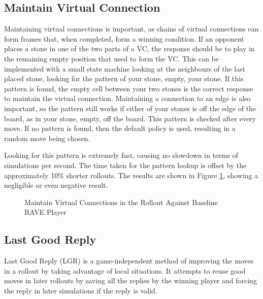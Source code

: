 \subsection{Maintain Virtual Connection}

Maintaining virtual connections is important, as chains of virtual connections can form frames that, when completed, form a winning condition. If an opponent places a stone in one of the two parts of a VC, the response should be to play in the remaining empty position that used to form the VC. This can be implemented with a small state machine looking at the neighbours of the last placed stone, looking for the pattern of your stone, empty, your stone. If this pattern is found, the empty cell between your two stones is the correct response to maintain the virtual connection. Maintaining a connection to an edge is also important, so the pattern still works if either of your stones is off the edge of the board, as in your stone, empty, off the board. This pattern is checked after every move. If no pattern is found, then the default policy is used, resulting in a random move being chosen.

Looking for this pattern is extremely fast, causing no slowdown in terms of simulations per second. The time taken for the pattern lookup is offset by the approximately 10\% shorter rollouts. The results are shown in Figure \ref{fig:maintainvcrollout}, showing a negligible or even negative result.

\begin{figure}
	\centering
{}
	\caption{Maintain Virtual Connections in the Rollout Against Baseline RAVE Player}
	\label{fig:maintainvcrollout}
\end{figure}

\subsection{Last Good Reply}

Last Good Reply (LGR) is a game-independent method of improving the moves in a rollout by taking advantage of local situations. It attempts to reuse good moves in later rollouts by saving all the replies by the winning player and forcing the reply in later simulations if the reply is valid.

